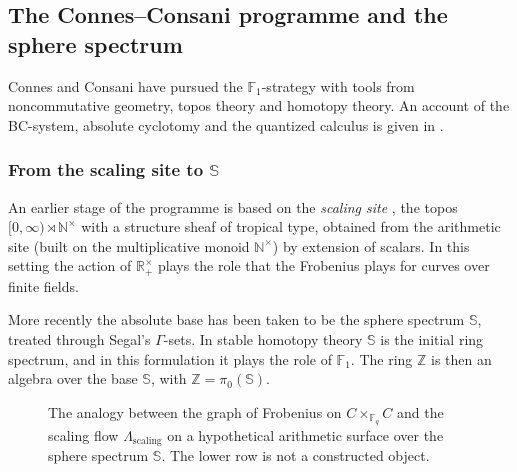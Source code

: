 \documentclass[11pt]{amsart}
\theoremstyle{definition}
\theoremstyle{remark}
\begin{document}
\subsection{The Connes--Consani programme and the sphere spectrum}\label{sec:cc}

Connes and Consani have pursued the $\mathbb{F}_1$-strategy with tools from noncommutative geometry, topos theory and homotopy theory. An account of the BC-system, absolute cyclotomy and the quantized calculus is given in \cite{connes2022}.

\subsubsection{From the scaling site to \texorpdfstring{$\mathbb{S}$}{S}}

An earlier stage of the programme is based on the \emph{scaling site} \cite{connes2016}, the topos $[0,\infty)\rtimes\mathbb{N}^\times$ with a structure sheaf of tropical type, obtained from the arithmetic site (built on the multiplicative monoid $\mathbb{N}^\times$) by extension of scalars. In this setting the action of $\mathbb{R}_{+}^{\times}$ plays the role that the Frobenius plays for curves over finite fields.

More recently the absolute base has been taken to be the sphere spectrum $\mathbb{S}$, treated through Segal's $\Gamma$-sets. In stable homotopy theory $\mathbb{S}$ is the initial ring spectrum, and in this formulation it plays the role of $\mathbb{F}_1$. The ring $\mathbb{Z}$ is then an algebra over the base $\mathbb{S}$, with $\mathbb{Z}=\pi_0(\mathbb{S})$.

\begin{figure}[ht]
\centering
{}
\caption{The analogy between the graph of Frobenius on $C\times_{\mathbb{F}_q}C$ and the scaling flow $\Lambda_{\text{scaling}}$ on a hypothetical arithmetic surface over the sphere spectrum $\mathbb{S}$. The lower row is not a constructed object.}
\label{fig:frobenius_analogy}
\end{figure}
\end{document}
